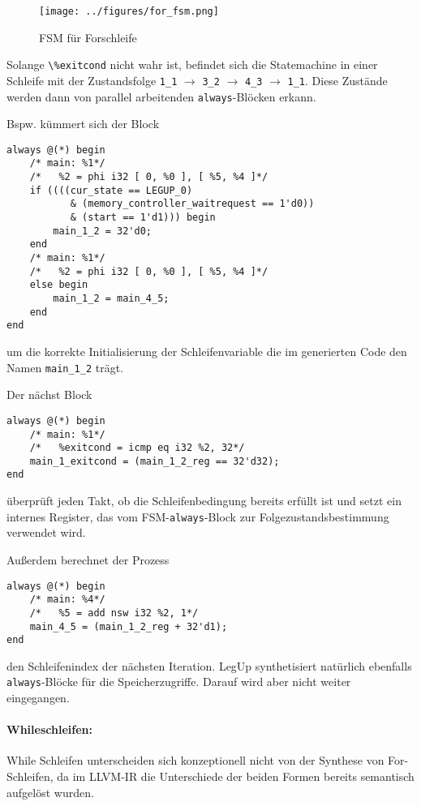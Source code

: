 \documentclass[oneside,a4paper]{article}
\def\A#1{\lstinline[style=asm]{#1}}
\def\V#1{\lstinline[style=verilog]{#1}}
\begin{document}
\begin{figure}[H]
  \centering
  \texttt{[image: ../figures/for\_fsm.png]}
  \caption{FSM für Forschleife}
\label{fig:for_fsm.png}
\end{figure}

Solange \A{\%exitcond} nicht wahr ist, befindet sich die Statemachine
in einer Schleife mit der Zustandsfolge
\V{1_1} \( \to \) \V{3_2} \( \to \) \V{4_3} \( \to \) \V{1_1}.
Diese Zustände werden dann von parallel arbeitenden \V{always}-Blöcken
erkann.


Bspw. kümmert sich der Block
\begin{lstlisting}[style=verilog]
always @(*) begin
    /* main: %1*/
    /*   %2 = phi i32 [ 0, %0 ], [ %5, %4 ]*/
    if ((((cur_state == LEGUP_0)
           & (memory_controller_waitrequest == 1'd0))
           & (start == 1'd1))) begin
        main_1_2 = 32'd0;
    end
    /* main: %1*/
    /*   %2 = phi i32 [ 0, %0 ], [ %5, %4 ]*/
    else begin
        main_1_2 = main_4_5;
    end
end
\end{lstlisting}

um die korrekte Initialisierung der Schleifenvariable die im
generierten Code den Namen \V{main_1_2} trägt.


Der nächst Block
\begin{lstlisting}[style=verilog]
always @(*) begin
    /* main: %1*/
    /*   %exitcond = icmp eq i32 %2, 32*/
    main_1_exitcond = (main_1_2_reg == 32'd32);
end
\end{lstlisting}
überprüft jeden Takt, ob die Schleifenbedingung bereits erfüllt ist
und setzt ein internes Register, das vom FSM-\V{always}-Block zur
Folgezustandsbestimmung verwendet wird.


Außerdem berechnet der Prozess
\begin{lstlisting}[style=verilog]
always @(*) begin
    /* main: %4*/
    /*   %5 = add nsw i32 %2, 1*/
    main_4_5 = (main_1_2_reg + 32'd1);
end
\end{lstlisting}
den Schleifenindex der nächsten Iteration. LegUp synthetisiert
natürlich ebenfalls \V{always}-Blöcke für die Speicherzugriffe.
Darauf wird aber nicht weiter eingegangen.

\paragraph{Whileschleifen:}
While Schleifen unterscheiden sich konzeptionell nicht von der
Synthese von For-Schleifen, da im LLVM-IR die Unterschiede
der beiden Formen bereits semantisch aufgelöst wurden.
\end{document}

